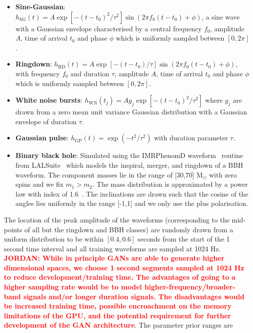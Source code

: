 \documentclass[12pt]{iopart}
\newcommand{\jordan}[1]{\textbf{\textcolor{red}{JORDAN: #1}}}
\begin{document}
%
\begin{itemize}
%
\item {\bf Sine-Gaussian}: $h_{\text{SG}}(t) = A \exp\left[ - (t-t_{0})^2 /
\tau^2 \right] \sin (2 \pi f_0 (t-t_0) + \phi)$, a sine wave with a Gaussian envelope characterised by a central frequency $f_0$, amplitude $A$, time of arrival $t_{0}$ and phase $\phi$ which is uniformly sampled between $[0, 2\pi]$.
%
\item {\bf Ringdown}: $h_{\text{RD}}(t) = A \exp \left[-{(t-t_0)} / {\tau}
\right] \sin(2 \pi f_0 (t-t_0) + \phi)$, with frequency $f_0$ and duration $\tau$, amplitude $A$, time of arrival $t_{0}$ and phase $\phi$ which is uniformly sampled between $[0, 2\pi]$. 
%
\item {\bf White noise bursts}: $h_{\text{WN}}(t_j) = Ag_j\exp\left[ -
(t-t_{0})^2 / \tau^2 \right]$ where $g_j$ are drawn from a zero mean unit
variance Gaussian distribution with a Gaussian envelope of duration $\tau$.
%
\item {\bf Gaussian pulse}: $h_{\text{GP}}(t) = \exp(-t^2 / \tau^2)$ with
duration parameter $\tau$.
%
\item {\bf Binary black hole}: Simulated using the IMRPhenomD
waveform~\cite{Khan_2016} routine from LALSuite~\cite{lalsuite} which models
the inspiral, merger, and ringdown of a \ac{BBH} waveform. The component masses
lie in the range of [30,70] $\textrm{M}_{\odot}$ with zero spins and we fix
$m_1>m_2$. The mass distribution is approximated by a power law with
index of 1.6~\cite{Abbott_2019}. The inclinations are drawn
such that the cosine of the angles lies uniformly in the range [-1,1] and we only use the plus polarisation.
%
\end{itemize}
%
The location of the peak amplitude of the waveforms (corresponding to the
mid-points of all but the ringdown and \ac{BBH} classes) are randomly drawn from a uniform distribution to
be within $[0.4, 0.6]$ seconds from the start of the 1 second time interval and all
training waveforms are sampled at 1024 Hz.  \jordan{While in principle GANs are able to generate higher dimensional spaces, we choose 1 second segments sampled at 1024 Hz to reduce development/training time. The advantages of going to a higher sampling rate would be to model higher-frequency/broader-band signals and/or longer duration signals. The disadvantages would be increased training time, possible encroachment on the memory limitations of the GPU, and the potential requirement for further development of the GAN architecture}. The parameter prior ranges are
\end{document}
